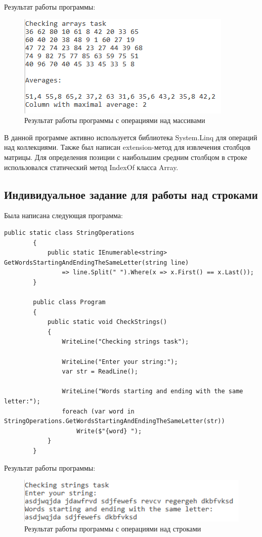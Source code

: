 \documentclass[a4paper,14pt]{extarticle}
\begin{document}
    Результат работы программы:

    \begin{figure}[H]
        \centering
        \includegraphics[width=.4\textwidth]{Arrays}
        \caption{Результат работы программы с операциями над массивами}
    \end{figure}

    В данной программе активно используется библиотека System.Linq для операций
    над коллекциями. Также был написан extension-метод для извлечения столбцов
    матрицы. Для определения позиции с наибольшим средним столбцом в строке
    использовался статический метод IndexOf класса Array.

    \subsection{Индивидуальное задание для работы над строками}

    Была написана следующая программа:

    \begin{lstlisting}[language={[Sharp]C}]
        public static class StringOperations
        {
            public static IEnumerable<string> GetWordsStartingAndEndingTheSameLetter(string line)
                => line.Split(" ").Where(x => x.First() == x.Last());
        }

        public class Program
        {
            public static void CheckStrings()
            {
                WriteLine("Checking strings task");

                WriteLine("Enter your string:");
                var str = ReadLine();

                WriteLine("Words starting and ending with the same letter:");
                foreach (var word in StringOperations.GetWordsStartingAndEndingTheSameLetter(str))
                    Write($"{word} ");
            }
        }
    \end{lstlisting}

    Результат работы программы:

    \begin{figure}[H]
        \centering
        \includegraphics[width=.4\textwidth]{Strings}
        \caption{Результат работы программы с операциями над строками}
    \end{figure}
\end{document}
